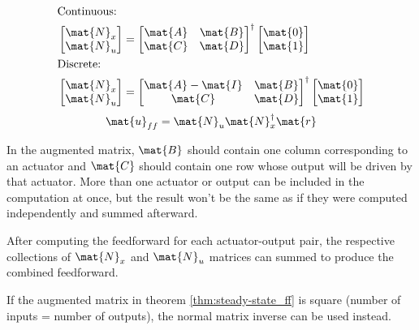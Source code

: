 \begin{theorem}
  \label{thm:steady-state_ff}
  \begin{align}
    &\text{Continuous:} \nonumber \\
    &\begin{bmatrix}
      \mat{N}_x \\
      \mat{N}_u
    \end{bmatrix} =
    \begin{bmatrix}
      \mat{A} & \mat{B} \\
      \mat{C} & \mat{D}
    \end{bmatrix}^{\dagger}
    \begin{bmatrix}
      \mat{0} \\
      \mat{1}
    \end{bmatrix} \\
    &\text{Discrete:} \nonumber \\
    &\begin{bmatrix}
      \mat{N}_x \\
      \mat{N}_u
    \end{bmatrix} =
    \begin{bmatrix}
      \mat{A} - \mat{I} & \mat{B} \\
      \mat{C} & \mat{D}
    \end{bmatrix}^{\dagger}
    \begin{bmatrix}
      \mat{0} \\
      \mat{1}
    \end{bmatrix}
  \end{align}
  \begin{equation}
    \mat{u}_{ff} = \mat{N}_u \mat{N}_x^\dagger \mat{r}
  \end{equation}

  In the augmented matrix, $\mat{B}$ should contain one column corresponding to
  an actuator and $\mat{C}$ should contain one row whose \gls{output} will be
  driven by that actuator. More than one actuator or output can be included in
  the computation at once, but the result won't be the same as if they were
  computed independently and summed afterward.

  After computing the feedforward for each actuator-output pair, the respective
  collections of $\mat{N}_x$ and $\mat{N}_u$ matrices can summed to produce the
  combined feedforward.
\end{theorem}

If the augmented matrix in theorem \ref{thm:steady-state_ff} is square (number
of \glspl{input} = number of \glspl{output}), the normal matrix inverse can be
used instead.

